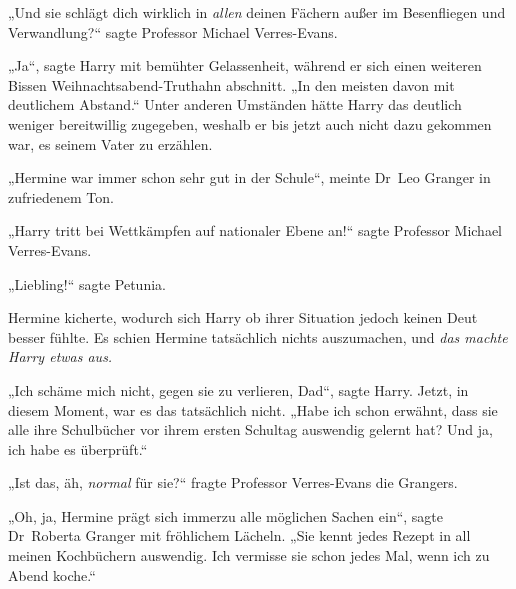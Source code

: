 „Und sie schlägt dich wirklich in \emph{allen} deinen Fächern außer im Besenfliegen und Verwandlung?“ sagte Professor Michael Verres-Evans.

„Ja“, sagte Harry mit bemühter Gelassenheit, während er sich einen weiteren Bissen Weihnachtsabend-Truthahn abschnitt.
„In den meisten davon mit deutlichem Abstand.“ Unter anderen Umständen hätte Harry das deutlich weniger bereitwillig zugegeben, weshalb er bis jetzt auch nicht dazu gekommen war, es seinem Vater zu erzählen.

„Hermine war immer schon sehr gut in der Schule“, meinte Dr~Leo Granger in zufriedenem Ton.

„Harry tritt bei Wettkämpfen auf nationaler Ebene an!“ sagte Professor Michael Verres-Evans.

„Liebling!“ sagte Petunia.

Hermine kicherte, wodurch sich Harry ob ihrer Situation jedoch keinen Deut besser fühlte. Es schien Hermine tatsächlich nichts auszumachen, und \emph{das machte Harry etwas aus.}

„Ich schäme mich nicht, gegen sie zu verlieren, Dad“, sagte Harry. Jetzt, in diesem Moment, war es das tatsächlich nicht.
„Habe ich schon erwähnt, dass sie alle ihre Schulbücher vor ihrem ersten Schultag auswendig gelernt hat? Und ja, ich habe es überprüft.“

„Ist das, äh, \emph{normal} für sie?“ fragte Professor Verres-Evans die Grangers.

„Oh, ja, Hermine prägt sich immerzu alle möglichen Sachen ein“, sagte Dr~Roberta Granger mit fröhlichem Lächeln.
„Sie kennt jedes Rezept in all meinen Kochbüchern auswendig. Ich vermisse sie schon jedes Mal, wenn ich zu Abend koche.“

